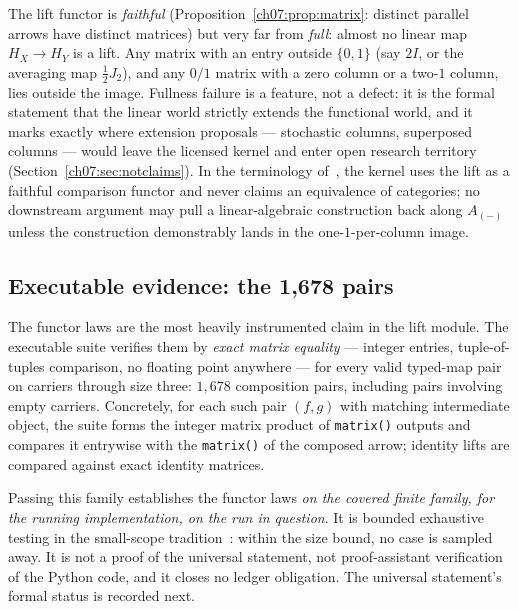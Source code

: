 \begin{remark}\label{ch07:rem:faithfulnotfull}
The lift functor is \emph{faithful} (Proposition~\ref{ch07:prop:matrix}:
distinct parallel arrows have distinct matrices) but very far from
\emph{full}: almost no linear map $H_X\to H_Y$ is a lift. Any matrix with an
entry outside $\{0,1\}$ (say $2I$, or the averaging map
$\tfrac12 J_2$), and any $0/1$ matrix with a zero column or a two-$1$
column, lies outside the image. Fullness failure is a feature, not a
defect: it is the formal statement that the linear world strictly extends
the functional world, and it marks exactly where extension proposals ---
stochastic columns, superposed columns --- would leave the licensed kernel
and enter open research territory (Section~\ref{ch07:sec:notclaims}). In
the terminology of~\cite{maclanecwm}, the kernel uses the lift as a
faithful comparison functor and never claims an equivalence of categories;
no downstream argument may pull a linear-algebraic construction back along
$A_{(-)}$ unless the construction demonstrably lands in the
one-$1$-per-column image.
\end{remark}

\subsection{Executable evidence: the 1{,}678 pairs}

The functor laws are the most heavily instrumented claim in the lift module.
The executable suite verifies them by \emph{exact matrix equality} --- integer
entries, tuple-of-tuples comparison, no floating point anywhere --- for every
valid typed-map pair on carriers through size three: $1{,}678$ composition
pairs, including pairs involving empty carriers. Concretely, for each such
pair $(f,g)$ with matching intermediate object, the suite forms the integer
matrix product of \texttt{matrix()} outputs and compares it entrywise with
the \texttt{matrix()} of the composed arrow; identity lifts are compared
against exact identity matrices.

\begin{boundary}\label{ch07:bd:pairs}
Passing this family establishes the functor laws \emph{on the covered finite
family, for the running implementation, on the run in question}. It is
bounded exhaustive testing in the small-scope tradition~\cite{jackson}: within
the size bound, no case is sampled away. It is not a proof of the universal
statement, not proof-assistant verification of the Python code, and it
closes no ledger obligation. The universal statement's formal status is
recorded next.
\end{boundary}

